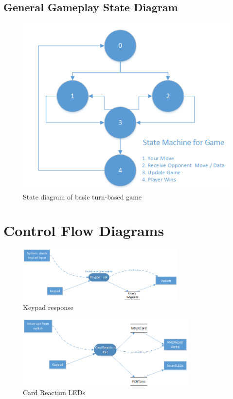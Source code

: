 \documentclass[12pt]{article} %
\begin{document}
\subsection{General Gameplay State Diagram\label{appendix:gameplayDiagram}}
\begin{figure}[H]
	\centering
	\includegraphics[width=\textwidth]{images/gamePlayState.png}
	\caption{State diagram of basic turn-based game}
	\label{fig:gamePlayState}
\end{figure}

\section{Control Flow Diagrams}

\begin{figure}[H]
	\centering
	\includegraphics[width=0.75\textwidth]{images/keypadDataFlow.png}
	\caption{Keypad response}
	\label{fig:keypadDataFlow}
\end{figure}

\begin{figure}[H]
	\centering
	\includegraphics[width=0.8\textwidth]{images/reactionDataFlow.png}
	\caption{Card Reaction LEDs}
	\label{fig:cardReactionDataFlow}
\end{figure}
\end{document}
